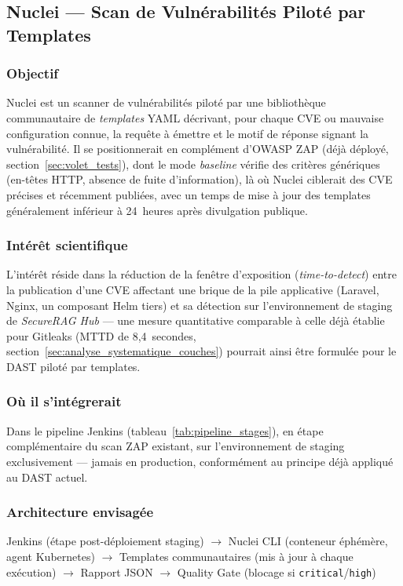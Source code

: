 \subsection{Nuclei — Scan de Vulnérabilités Piloté par Templates}
\label{subsec:nuclei_perspective}

\subsubsection{Objectif}
Nuclei est un scanner de vulnérabilités piloté par une bibliothèque communautaire de \textit{templates} YAML décrivant, pour chaque CVE ou mauvaise configuration connue, la requête à émettre et le motif de réponse signant la vulnérabilité. Il se positionnerait en complément d'OWASP ZAP (déjà déployé, section~\ref{sec:volet_tests}), dont le mode \textit{baseline} vérifie des critères génériques (en-têtes HTTP, absence de fuite d'information), là où Nuclei ciblerait des CVE précises et récemment publiées, avec un temps de mise à jour des templates généralement inférieur à 24~heures après divulgation publique.

\subsubsection{Intérêt scientifique}
L'intérêt réside dans la réduction de la fenêtre d'exposition (\textit{time-to-detect}) entre la publication d'une CVE affectant une brique de la pile applicative (Laravel, Nginx, un composant Helm tiers) et sa détection sur l'environnement de staging de \textit{SecureRAG Hub} — une mesure quantitative comparable à celle déjà établie pour Gitleaks (MTTD de 8,4~secondes, section~\ref{sec:analyse_systematique_couches}) pourrait ainsi être formulée pour le DAST piloté par templates.

\subsubsection{Où il s'intégrerait}
Dans le pipeline Jenkins (tableau~\ref{tab:pipeline_stages}), en étape complémentaire du scan ZAP existant, sur l'environnement de staging exclusivement — jamais en production, conformément au principe déjà appliqué au DAST actuel.

\subsubsection{Architecture envisagée}
\begin{center}
\scriptsize
Jenkins (étape post-déploiement staging) $\rightarrow$ Nuclei CLI (conteneur éphémère, agent Kubernetes) $\rightarrow$ Templates communautaires (mis à jour à chaque exécution) $\rightarrow$ Rapport JSON $\rightarrow$ Quality Gate (blocage si \texttt{critical}/\texttt{high})
\end{center}

